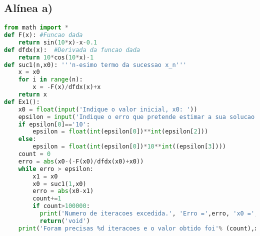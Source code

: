 \documentclass{article}
\begin{document}
\subsection*{Alínea a)}
\begin{lstlisting}[language=Python]
from math import *
def F(x): #Funcao dada
    return sin(10*x)-x-0.1
def dfdx(x):  #Derivada da funcao dada
    return 10*cos(10*x)-1
def suc1(n,x0): '''n-esimo termo da sucessao x_n'''
    x = x0
    for i in range(n):
        x = -F(x)/dfdx(x)+x
    return x
def Ex1():
    x0 = float(input('Indique o valor inicial, x0: '))
    epsilon = input('Indique o erro que pretende estimar a sua solucao: ').split('*')
    if epsilon[0]=='10':
        epsilon = float(int(epsilon[0])**int(epsilon[2]))
    else:
        epsilon = float(int(epsilon[0])*10**int((epsilon[3])))
    count = 0
    erro = abs(x0-(-F(x0)/dfdx(x0)+x0))
    while erro > epsilon:
        x1 = x0
        x0 = suc1(1,x0)
        erro = abs(x0-x1)
        count+=1
        if count>100000:
          print('Numero de iteracoes excedida.', 'Erro =',erro, 'x0 =',x0)
          return('void')
    print('Foram precisas %d iteracoes e o valor obtido foi'% (count),x0, "erro absoluto estimado: ",erro)
\end{lstlisting}
\end{document}
